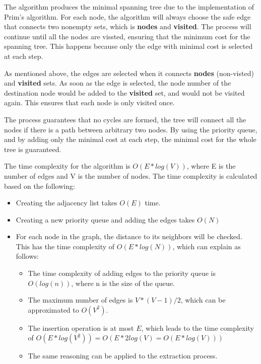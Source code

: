 \documentclass{article}
\begin{document}

  The algorithm produces the minimal spanning tree due to the implementation of Prim's algorithm.
  For each node, the algorithm will always choose the safe edge that connects two nonempty sets, which is 
  \textbf{nodes} and \textbf{visited}. The process will continue until all the nodes are vissted,
  ensuring that the minimum cost for the spanning tree. This happens because only the edge with minimal cost is 
  selected at each step. 

  As mentioned above, the edges are selected when it connects \textbf{nodes} (non-visted) and \textbf{visited} sets.
  As soon as the edge is selected, the node number of the destination node would be added to the \textbf{visited} set, 
  and would not be visited again. This ensures that each node is only visited once. 
  
  The process guarantees that no cycles are formed, the tree will connect all the nodes if there is a path between arbitrary two nodes.
  By using the priority queue, and by adding only the minimal cost at each step, the minimal cost for the whole tree 
  is guaranteed.


  The time complexity for the algorithm is $O(E * log (V))$, where E is the number of edges and V is the number of nodes.
  The time complexity is calculated based on the following: 
  \begin{itemize}
    \item Creating the adjacency list takes $O(E)$ time.
    \item Creating a new priority queue and adding the edges takes $O(N)$
    \item For each node in the graph, the distance to its neighbors will be checked.
    This has the time complexity of $O (E * log (N))$, which can explain as follows:
    \begin{itemize}
      \item The time complexity of adding edges to the priority queue is $O(log (n))$, 
    where n is the size of the queue. 
      \item The maximum number of edges is $V*(V -1)/2$, which can be approximated to $O(V^2)$.
      \item The insertion operation is at most $E$, which leads to the time complexity of $O(E * log (V^2)) = O(E * 2log(V) = O(E * log(V)))$
      \item The same reasoning can be applied to the extraction process.
    \end{itemize}
  \end{itemize}
\end{document}
